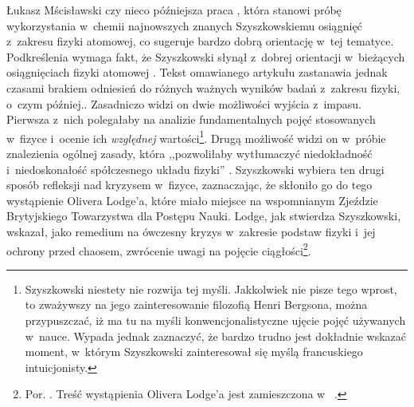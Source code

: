 \begin{artplenv}{Łukasz Mścisławski}
{ czy nieco późniejsza praca 
\parencite[][]{szyszkowski_1918}, %
 która stanowi próbę wykorzystania w~chemii najnowszych znanych Szyszkowskiemu osiągnięć z~zakresu fizyki atomowej, co sugeruje bardzo dobrą orientację w~tej tematyce. Podkreślenia wymaga fakt, że Szyszkowski słynął z~dobrej orientacji w~bieżących osiągnięciach fizyki atomowej 
\parencite[por. np.][s.~784]{swietoslawski_sp_1931}. %
 Tekst omawianego artykułu zastanawia jednak czasami brakiem odniesień do różnych ważnych wyników badań z~zakresu fizyki, o~czym później.}.
 Zasadniczo widzi on dwie możliwości wyjścia z~impasu. Pierwsza z~nich polegałaby na analizie fundamentalnych pojęć stosowanych w~fizyce i~ocenie ich \textit{względnej} wartości\footnote{Szyszkowski niestety nie rozwija tej myśli. Jakkolwiek nie pisze tego wprost, to zważywszy na jego zainteresowanie filozofią Henri Bergsona, można przypuszczać, iż ma tu na myśli konwencjonalistyczne ujęcie pojęć używanych w~nauce. Wypada jednak zaznaczyć, że bardzo trudno jest dokładnie wskazać moment, w~którym Szyszkowski zainteresował się myślą francuskiego intuicjonisty.}. Drugą możliwość widzi on w~próbie znalezienia ogólnej zasady, która ,,pozwoliłaby wytłumaczyć niedokładność i~niedoskonałość spółczesnego układu fizyki'' 
\parencite[][s.~44]{szyszkowski_o_1916}. %
 Szyszkowski wybiera ten drugi sposób refleksji nad kryzysem w~fizyce, zaznaczając, że skłoniło go do tego wystąpienie Olivera Lodge'a, które miało miejsce na wspomnianym Zjeździe Brytyjskiego Towarzystwa dla Postępu Nauki. Lodge, jak stwierdza Szyszkowski, wskazał, jako remedium na ówczesny kryzys w~zakresie podstaw fizyki i~jej ochrony przed chaosem, zwrócenie uwagi na pojęcie ciągłości\footnote{Por. 
\parencite[][s.~44–45]{szyszkowski_o_1916}. %
 Treść wystąpienia Olivera Lodge'a jest zamieszczona w~
\parencite[][o~ciągłości zwłaszcza s.~5-10]{british_association_for_the_advancement_of_science_report_1914}.%
}.


\end{artplenv}
